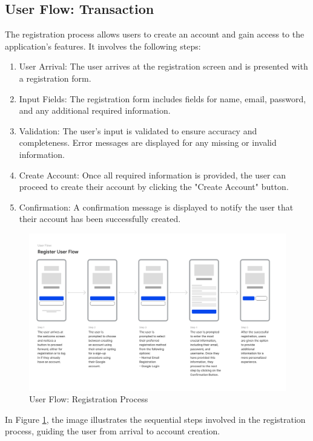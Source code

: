 \subsection{User Flow: Transaction}

The registration process allows users to create an account and gain access to the application's features. It involves the following steps:

\begin{enumerate}
  \item User Arrival: The user arrives at the registration screen and is presented with a registration form.
  \item Input Fields: The registration form includes fields for name, email, password, and any additional required information.
  \item Validation: The user's input is validated to ensure accuracy and completeness. Error messages are displayed for any missing or invalid information.
  \item Create Account: Once all required information is provided, the user can proceed to create their account by clicking the "Create Account" button.
  \item Confirmation: A confirmation message is displayed to notify the user that their account has been successfully created.
\end{enumerate}


\begin{figure}[ht]
  \centering
  \includegraphics[width=\textwidth]{Graphics/UserFlows/RegisterUserFlow.png}
  \caption{User Flow: Registration Process}
  \label{fig:registration_flow}
\end{figure}

In Figure \ref{fig:registration_flow}, the image illustrates the sequential steps involved in the registration process, guiding the user from arrival to account creation.

